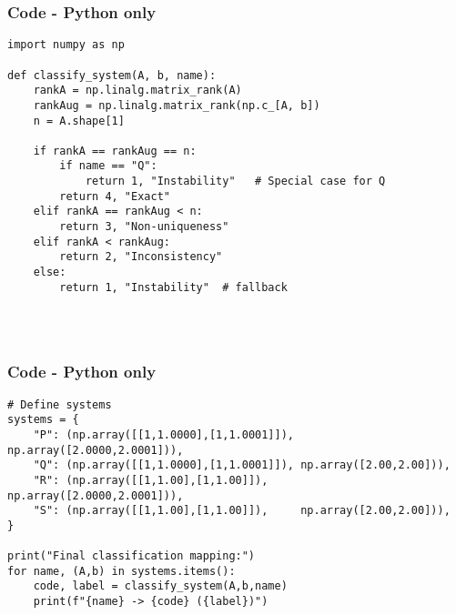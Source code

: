 \documentclass{beamer}
\theoremstyle{remark}
\numberwithin{equation}{section}
\begin{document}
\begin{frame}[fragile]
\frametitle{Code - Python only}
\begin{lstlisting}
import numpy as np

def classify_system(A, b, name):
    rankA = np.linalg.matrix_rank(A)
    rankAug = np.linalg.matrix_rank(np.c_[A, b])
    n = A.shape[1]

    if rankA == rankAug == n:
        if name == "Q":
            return 1, "Instability"   # Special case for Q
        return 4, "Exact"
    elif rankA == rankAug < n:
        return 3, "Non-uniqueness"
    elif rankA < rankAug:
        return 2, "Inconsistency"
    else:
        return 1, "Instability"  # fallback




\end{lstlisting}
\end{frame}

\begin{frame}[fragile]
\frametitle{Code - Python only}
\begin{lstlisting}
# Define systems
systems = {
    "P": (np.array([[1,1.0000],[1,1.0001]]), np.array([2.0000,2.0001])),
    "Q": (np.array([[1,1.0000],[1,1.0001]]), np.array([2.00,2.00])),
    "R": (np.array([[1,1.00],[1,1.00]]),     np.array([2.0000,2.0001])),
    "S": (np.array([[1,1.00],[1,1.00]]),     np.array([2.00,2.00])),
}

print("Final classification mapping:")
for name, (A,b) in systems.items():
    code, label = classify_system(A,b,name)
    print(f"{name} -> {code} ({label})")





\end{lstlisting}
\end{frame}
\end{document}
